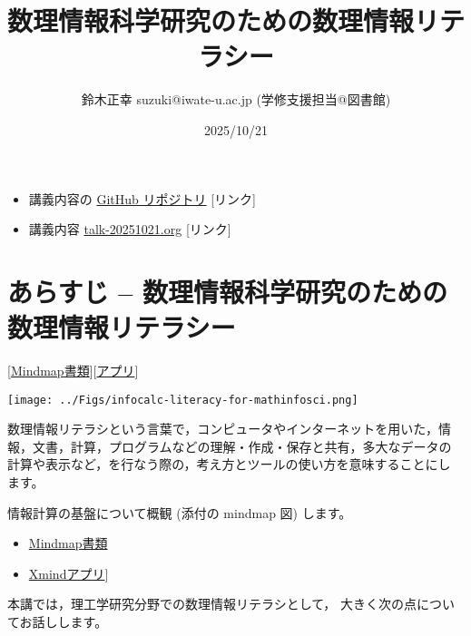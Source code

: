 \documentclass[dvipdfmx,11pat]{jarticle}
\author{鈴木正幸 suzuki@iwate-u.ac.jp (学修支援担当@図書館)}
\date{2025/10/21}
\title{ 数理情報科学研究のための数理情報リテラシー}
\begin{document}
\maketitle
\begin{itemize}
\item 講義内容の \href{https://github.com/masayuki054/comp\_and\_cal/}{GitHub リポジトリ} {[}リンク]
\item 講義内容 \href{https://github.com/masayuki054/comp\_and\_cal/blob/master/org/talk-20251021.org}{talk-20251021.org} {[}リンク]
\end{itemize}
\section{あらすじ -- 数理情報科学研究のための数理情報リテラシー}
\label{sec:org5aa60b1}

{[}\href{../Maps/数理情報科学のための情報計算リテラシー.xmind}{Mindmap書類}][\href{shell:xmind ../Maps/数理情報科学のための情報計算リテラシー.xmind}{アプリ}]

\begin{center}
\texttt{[image: ../Figs/infocalc-literacy-for-mathinfosci.png]}
\end{center}

数理情報リテラシという言葉で，コンピュータやインターネットを用いた，情
報，文書，計算，プログラムなどの理解・作成・保存と共有，多大なデータの
計算や表示など，を行なう際の，考え方とツールの使い方を意味することにし
ます。

情報計算の基盤について概観 (添付の mindmap 図) します。
\begin{itemize}
\item \href{../Maps/ICTの利用目的.xmind}{Mindmap書類}
\item \href{shell:xmind ../Maps/ICTの利用目的.xmind}{Xmindアプリ}]
\end{itemize}

本講では，理工学研究分野での数理情報リテラシとして，
大きく次の点についてお話しします。
\end{document}
